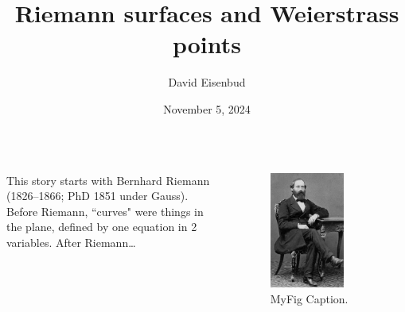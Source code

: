 \documentclass[12pt, aspectratio=169]{beamer}
\title{Riemann surfaces and Weierstrass points}
\author{David Eisenbud}
\date{November 5, 2024}
\begin{document}
\maketitle


\begin{frame}{}
\begin{columns}
 This story starts with \alert{Bernhard Riemann} (1826--1866; PhD 1851 under Gauss).
Before Riemann, ``curves" were things in the plane, defined by one equation in 2 variables. After Riemann\dots
{}
\begin{figure}
    \centering
    \includegraphics[width=0.7\textwidth]{"Bernhard-Riemann.jpg"}
    \caption{\label{fig:Riemann}MyFig Caption.}
\end{figure}
\end{columns}
 \end{frame}
\end{document}
